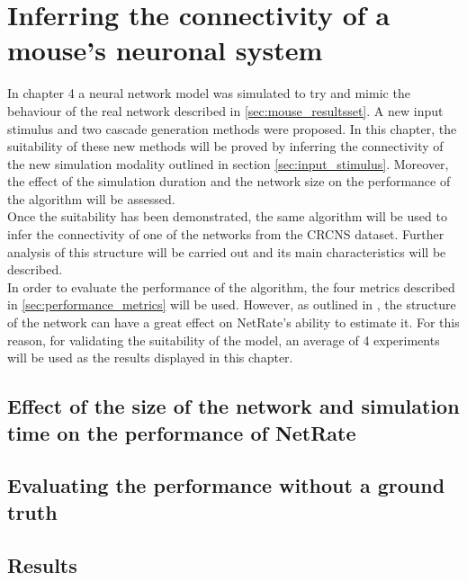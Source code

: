 
\chapter{Inferring the connectivity of a mouse's neuronal system}

In chapter 4 a neural network model was simulated to try and mimic the behaviour of the real network described in \ref{sec:mouse_resultsset}. A new input stimulus and two cascade generation methods were proposed. In this chapter, the suitability of these new methods will be proved by inferring the connectivity of the new simulation modality outlined in section \ref{sec:input_stimulus}. Moreover, the effect of the simulation duration and the network size on the performance of the algorithm will be assessed.\\

Once the suitability has been demonstrated, the same algorithm will be used to infer the connectivity of one of the networks from the CRCNS dataset. Further analysis of this structure will be carried out and its main characteristics will be described.\\

In order to evaluate the performance of the algorithm, the four metrics described in \ref{sec:performance_metrics} will be used. However, as outlined in \cite{pranav_report}, the structure of the network can have a great effect on NetRate's ability to estimate it. For this reason, for validating the suitability of the model, an average of 4 experiments will be used as the results displayed in this chapter.






\section{Effect of the size of the network and simulation time on the performance of NetRate}
\section{Evaluating the performance without a ground truth}
\section{Results}
